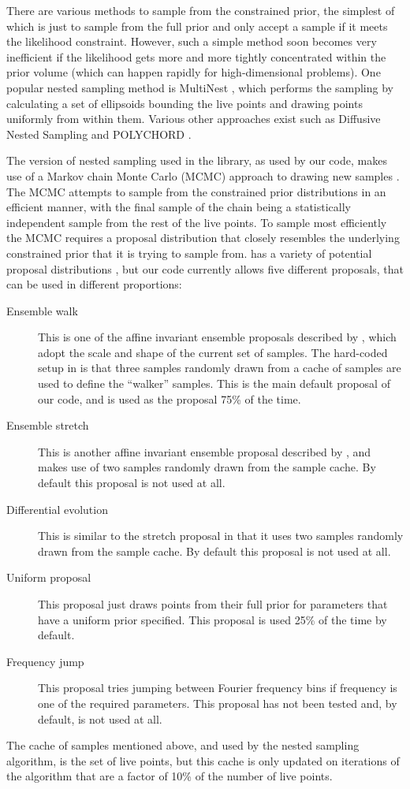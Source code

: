 There are various methods to sample from the constrained prior, the simplest of which is just to sample from the full
prior and only accept a sample if it meets the likelihood constraint. However, such a simple method soon becomes very
inefficient if the likelihood gets more and more tightly concentrated within the prior volume (which can happen rapidly
for high-dimensional problems). One popular nested sampling method is MultiNest \citep{2009MNRAS.398.1601F}, which performs
the sampling by calculating a set of ellipsoids bounding the live points and drawing points uniformly from within them.
Various other approaches exist such as Diffusive Nested Sampling \citep{Brewer2011,2016arXiv160603757B} and POLYCHORD \citep{2015MNRAS.450L..61H}.

The version of nested sampling used in the \lalinf library, as used by our code, makes use of a Markov chain Monte Carlo (MCMC) approach to
drawing new samples \citep{Veitch:2010}. The MCMC attempts to sample from the constrained prior distributions in an efficient manner, with
the final sample of the chain being a statistically independent sample from the rest of the live points. To sample most efficiently
the MCMC requires a proposal distribution that closely resembles the underlying constrained prior that it is trying to sample from.
\lalinf has a variety of potential proposal distributions \citep{2015PhRvD..91d2003V}, but our code currently allows five different
proposals, that can be used in different proportions:
\begin{description}
 \item[Ensemble walk] This is one of the affine invariant ensemble proposals described by \citet{GoodmanWeare}, which adopt the
 scale and shape of the current set of samples. The hard-coded setup in \lalinf is that three samples randomly drawn from a cache
 of samples are used to define the ``walker'' samples. This is the main default proposal of our code, and is used as the proposal
 75\% of the time.
 \item[Ensemble stretch] This is another affine invariant ensemble proposal described by \citet{GoodmanWeare}, and makes use of
 two samples randomly drawn from the sample cache. By default this proposal is not used at all.
 \item[Differential evolution] This is similar to the stretch proposal in that it uses two samples randomly drawn from the sample
 cache. By default this proposal is not used at all.
 \item[Uniform proposal] This proposal just draws points from their full prior for parameters that have a uniform prior specified.
 This proposal is used 25\% of the time by default.
 \item[Frequency jump] This proposal tries jumping between Fourier frequency bins if frequency is one of the required parameters.
 This proposal has not been tested and, by default, is not used at all.
\end{description}
The cache of samples mentioned above, and used by the nested sampling algorithm, is the set of live points, but this cache is
only updated on iterations of the algorithm that are a factor of 10\% of the number of live points.

